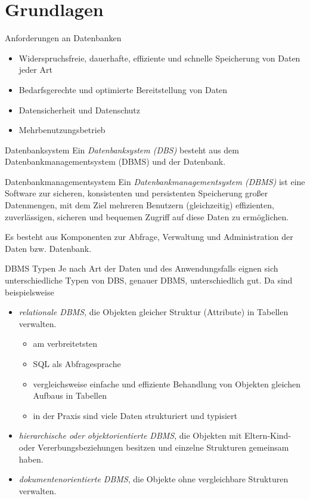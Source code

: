 \section{Grundlagen}

\begin{defi}{Anforderungen an Datenbanken}
    \begin{itemize}
        \item Widerspruchsfreie, dauerhafte, effiziente und schnelle Speicherung von Daten jeder Art
        \item Bedarfsgerechte und optimierte Bereitstellung von Daten
        \item Datensicherheit und Datenschutz
        \item Mehrbenutzungsbetrieb
    \end{itemize}
\end{defi}

\begin{defi}{Datenbanksystem}
    Ein \emph{Datenbanksystem (DBS)} besteht aus dem Datenbankmanagementsystem (DBMS) und der Datenbank.
\end{defi}

\begin{defi}{Datenbankmanagementsystem}
    Ein \emph{Datenbankmanagementsystem (DBMS)} ist eine Software zur sicheren, konsistenten und persistenten Speicherung großer Datenmengen, mit dem Ziel mehreren Benutzern (gleichzeitig) effizienten, zuverlässigen, sicheren und bequemen Zugriff auf diese Daten zu ermöglichen.

    Es besteht aus Komponenten zur Abfrage, Verwaltung und Administration der Daten bzw. Datenbank.
\end{defi}

\begin{bonus}{DBMS Typen}
    Je nach Art der Daten und des Anwendungsfalls eignen sich unterschiedliche Typen von DBS, genauer DBMS, unterschiedlich gut.
    Da sind beispielsweise
    \begin{itemize}
        \item \emph{relationale DBMS}, die Objekten gleicher Struktur (Attribute) in Tabellen verwalten.
              \begin{itemize}
                  \item am verbreitetsten
                  \item SQL als Abfragesprache
                  \item vergleichsweise einfache und effiziente Behandlung von Objekten gleichen Aufbaus in Tabellen
                  \item in der Praxis sind viele Daten strukturiert und typisiert
              \end{itemize}
        \item \emph{hierarchische oder objektorientierte DBMS}, die Objekten mit Eltern-Kind- oder Vererbungsbeziehungen besitzen und einzelne Strukturen gemeinsam haben.
        \item \emph{dokumentenorientierte DBMS}, die Objekte ohne vergleichbare Strukturen verwalten.
    \end{itemize}
\end{bonus}

